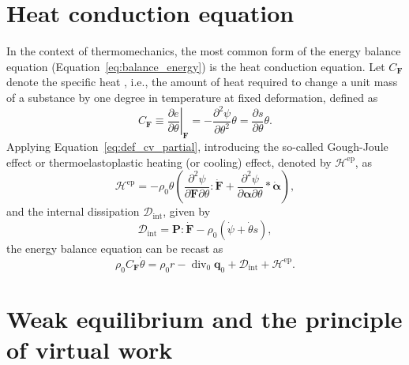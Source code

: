 \section{Heat conduction equation}
\label{sec:heat-cond-equat}

In the context of thermomechanics, the most common form of the energy balance equation (Equation~\eqref{eq:balance_energy}) is the heat conduction equation.
Let \(C_{\bm F}\) denote the specific heat , i.e., the amount of heat required to change a unit mass of a substance by one degree in temperature at fixed deformation, defined as
\begin{equation} \label{eq:def_cv_partial}
  C_{\bm F}\equiv \left.\frac{\partial e}{\partial \theta}\right|_{\bm F}=-\frac{\partial^{2} \psi}{\partial \theta^{2}} \theta=\frac{\partial s}{\partial \theta} \theta.
\end{equation}
Applying Equation~\eqref{eq:def_cv_partial}, introducing the so-called Gough-Joule effect or thermoelastoplastic heating (or cooling) effect, denoted by \(\mathcal H^\text{ep}\), as
\begin{equation}
  \mathcal H^\text{ep} = - \rho_0\theta\left(\frac{\partial^2 \psi}{\partial \bm{F}\partial \theta}: \dot{\bm{F}} + \frac{\partial^2 \psi}{\partial \bm{\alpha} \partial \theta}*\dot{\bm{\alpha}} \right),
\end{equation}
and the internal dissipation \(\mathcal D_\text{int}\), given by
\begin{equation}
  \mathcal D_\text{int} = \bm{P}:\dot{\bm{F}} - \rho_0(\dot \psi + \dot \theta s),
\end{equation}
the energy balance equation can be recast as
\begin{equation}
  \label{eq:heat_conduction}
  \rho_0 C_{\bm F} \dot \theta = \rho_0 r - \operatorname{div}_0 \bm{q}_0 + \mathcal D_\text{int} + \mathcal H^\text{ep}.
\end{equation}

\section{Weak equilibrium and the principle of virtual work}

